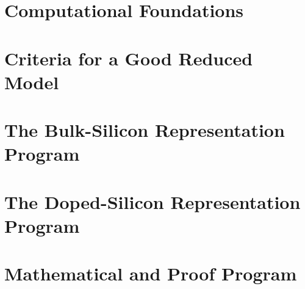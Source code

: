 \documentclass[12pt,oneside]{report}
\theoremstyle{monographplain}
\theoremstyle{monographdefinition}
\begin{document}
\part{Computational Foundations}














\part{Criteria for a Good Reduced Model}





\part{The Bulk-Silicon Representation Program}







\part{The Doped-Silicon Representation Program}







\part{Mathematical and Proof Program}




\end{document}

